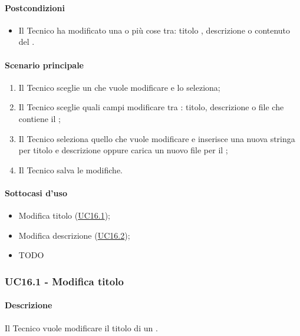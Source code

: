\paragraph*{Postcondizioni}
\begin{itemize}
  \item Il Tecnico ha modificato una o più cose tra: titolo , descrizione o contenuto del .
\end{itemize}

\paragraph*{Scenario principale}
\begin{enumerate}
  \item Il Tecnico sceglie un  che vuole modificare e lo seleziona;
  \item Il Tecnico sceglie quali campi modificare tra : titolo, descrizione o file che contiene il ;
  \item Il Tecnico seleziona quello che vuole modificare e inserisce una nuova stringa per titolo e descrizione oppure carica un nuovo file per il ;
  \item Il Tecnico salva le modifiche.  
\end{enumerate}

\paragraph*{Sottocasi d'uso}
\begin{itemize}
  \item Modifica titolo  (\hyperref[UC16point1]{UC16.1});
  \item Modifica descrizione  (\hyperref[UC16point2]{UC16.2});
  \item TODO
\end{itemize}


\subsubsection{UC16.1 - Modifica titolo }\label{UC16point1}
\paragraph*{Descrizione} Il Tecnico vuole modificare il titolo di un .
